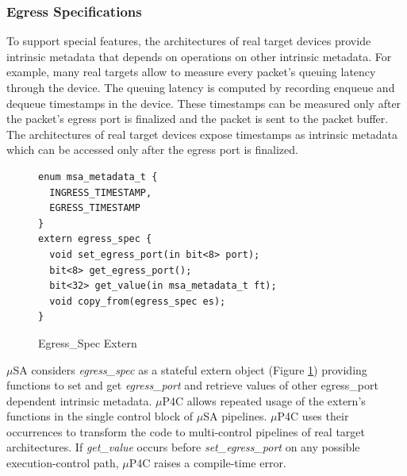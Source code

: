 \documentclass{hotnets19}
\begin{document}
\subsubsection{Egress Specifications}
To support special features, the architectures of real target devices provide intrinsic metadata  that depends on operations on other intrinsic metadata.
For example,  many real targets allow to measure every packet's queuing latency through the device.
The queuing latency is computed by recording enqueue and dequeue timestamps in the device.
These timestamps can be measured only after the packet's egress port is finalized and the packet is sent to the packet buffer.
The architectures of real target devices expose timestamps as intrinsic metadata which can be accessed only after the egress port is finalized.
\begin{figure}[!h]
\begin{lstlisting}[frame=none]
enum msa_metadata_t {
  INGRESS_TIMESTAMP,
  EGRESS_TIMESTAMP
}
extern egress_spec {
  void set_egress_port(in bit<8> port);
  bit<8> get_egress_port();
  bit<32> get_value(in msa_metadata_t ft);
  void copy_from(egress_spec es);
}
\end{lstlisting}
\caption{Egress\_Spec Extern}
\label{fig:msa-egress-spec-extern}
\end{figure}
$\mu$SA considers \emph{egress\_spec} as a stateful extern object (Figure \ref{fig:msa-egress-spec-extern}) providing functions to set and get \emph{egress\_port} and retrieve values of other egress\_port dependent intrinsic metadata.
$\mu$P4C allows repeated usage of the extern's functions in the single control block of $\mu$SA pipelines.
$\mu$P4C uses their occurrences to transform the code to multi-control pipelines of real target architectures.
If \emph{get\_value} occurs before \emph{set\_egress\_port} on any possible execution-control path, $\mu$P4C raises a compile-time error.
\end{document}
